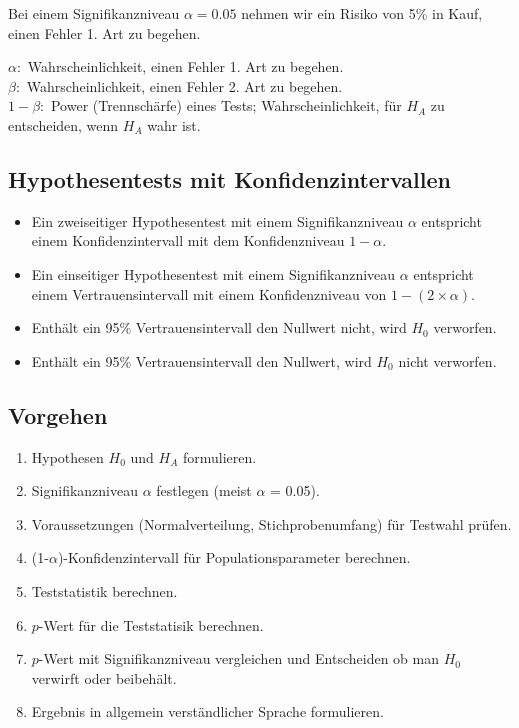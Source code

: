 \documentclass[
]{book}
\providecommand{\tightlist}{%
  \setlength{\itemsep}{0pt}\setlength{\parskip}{0pt}}
\begin{document}
Bei einem Signifikanzniveau \(\alpha = 0.05\) nehmen wir ein Risiko von 5\% in Kauf, einen Fehler 1. Art zu begehen.

\(\alpha:\) Wahrscheinlichkeit, einen Fehler 1. Art zu begehen.\\
\(\beta:\) Wahrscheinlichkeit, einen Fehler 2. Art zu begehen.\\
\(1-\beta:\) Power (Trennschärfe) eines Tests; Wahrscheinlichkeit, für \(H_A\) zu entscheiden, wenn \(H_A\) wahr ist.

\hypertarget{hypothesentests-mit-konfidenzintervallen}{%
\subsection{Hypothesentests mit Konfidenzintervallen}\label{hypothesentests-mit-konfidenzintervallen}}

\begin{itemize}
\tightlist
\item
  Ein zweiseitiger Hypothesentest mit einem Signifikanzniveau \(\alpha\) entspricht einem Konfidenzintervall mit dem Konfidenzniveau \(1-\alpha\).\\
\item
  Ein einseitiger Hypothesentest mit einem Signifikanzniveau \(\alpha\) entspricht einem Vertrauensintervall mit einem Konfidenzniveau von \(1-(2 \times \alpha)\).\\
\item
  Enthält ein 95\% Vertrauensintervall den Nullwert nicht, wird \(H_0\) verworfen.\\
\item
  Enthält ein 95\% Vertrauensintervall den Nullwert, wird \(H_0\) nicht verworfen.
\end{itemize}

\hypertarget{vorgehen-1}{%
\subsection{Vorgehen}\label{vorgehen-1}}

\begin{enumerate}
\def\labelenumi{\arabic{enumi}.}
\tightlist
\item
  Hypothesen \(H_0\) und \(H_A\) formulieren.
\item
  Signifikanzniveau \(\alpha\) festlegen (meist \(\alpha\) = 0.05).
\item
  Voraussetzungen (Normalverteilung, Stichprobenumfang) für Testwahl prüfen.
\item
  (1-\(\alpha\))-Konfidenzintervall für Populationsparameter berechnen.
\item
  Teststatistik berechnen.\\
\item
  \(p\)-Wert für die Teststatisik berechnen.\\
\item
  \(p\)-Wert mit Signifikanzniveau vergleichen und Entscheiden ob man \(H_0\) verwirft oder beibehält.
\item
  Ergebnis in allgemein verständlicher Sprache formulieren.
\end{enumerate}
\end{document}
